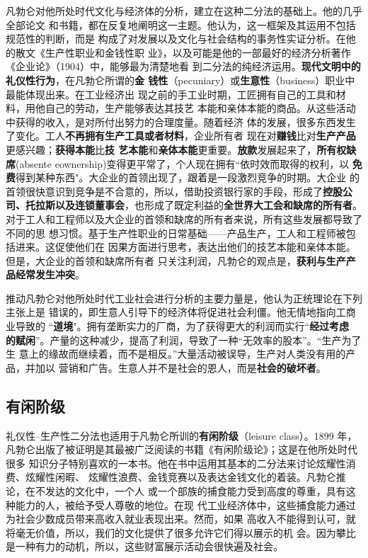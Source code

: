 凡勃仑对他所处时代文化与经济体的分析，建立在这种二分法的基础上。他的几乎全部论文
和书籍，都在反复地阐明这一主题。他认为，这一框架及其运用不包括规范性的判断，而是
构成了对发展以及文化与社会结构的事务性实证分析。在他的散文《生产性职业和金钱性职
业》，以及可能是他的一部最好的经济分析著作《企业论》（1904）中，能够最为清楚地看
到二分法的纯经济运用。\textbf{现代文明中的礼仪性行为}，在凡勃仑所谓的\textbf{金
钱性}（pecuniary）或\textbf{生意性}（business）职业中最能体现出来。在工业经济出
现之前的手工业时期，工匠拥有自己的工具和材料，用他自己的劳动，生产能够表达其技艺
本能和亲体本能的商品。从这些活动中获得的收入，是对所付出努力的合理度量。随着经济
体的发展，很多东西发生了变化。工人\textbf{不再拥有生产工具或者材料}，企业所有者
现在对\textbf{赚钱}比对\textbf{生产产品}更感兴趣；\textbf{获得本能}比\textbf{技
艺本能}和\textbf{亲体本能}更重要。\textbf{放款}发展起来了，\textbf{所有权缺
席}(absente eownership)变得更平常了，个人现在拥有“依时效而取得的权利，以
\textbf{免费}得到某种东西"。大企业的首领出现了，跟着是一段激烈竞争的时期。大企业
的首领很快意识到竞争是不合意的，所以，借助投资银行家的手段，形成了\textbf{控股公
司、托拉斯以及连锁董事会}，也形成了既定利益的\textbf{全世界大工会和缺席的所有者}。
对于工人和工程师以及大企业的首领和缺席的所有者来说，所有这些发展都导致了不同的思
想习惯。基于生产性职业的日常基础——产品生产，工人和工程师被包括进来。这促使他们在
因果方面进行思考，表达出他们的技艺本能和亲体本能。但是，大企业的首领和缺席所有者
只关注利润，凡勃仑的观点是，\textbf{获利与生产产品经常发生冲突}。

推动凡勃仑对他所处时代工业社会进行分析的主要力量是，他认为正统理论在下列主张上是
错误的，即生意人引导下的经济体将促进社会利僵。他无情地指向工商业导致的
“\textbf{道境}"。拥有垄断实力的厂商，为了获得更大的利润而实行“\textbf{经过考虑
的赋闲}”。产量的这种减少，提高了利润，导致了一种“无效率的股本”。“生产为了生
意上的缘故而继续着，而不是相反。”大量活动被误导，生产对人类没有用的产品，并加以
营销和广告。生意人并不是社会的恩人，而是\textbf{社会的破坏者}。

\subsection{有闲阶级}

礼仪性--生产性二分法也适用于凡勃仑所训的\textbf{有闲阶级}（leisure class）。1899
年，凡勃仑出版了被证明是其最被广泛阅读的书籍《有闲阶级论》；这是在他所处时代很多
知识分子特别喜欢的一本书。他在书中运用其基本的二分法来讨论炫耀性消费、炫耀性闲暇、
炫耀性浪费、金钱竞赛以及表达金钱文化的着装。凡勃仑推论，在不发达的文化中，一个人
或一个部族的捕食能力受到高度的尊重，具有这种能力的人，被给予受人尊敬的地位。在现
代工业经济体中，这些捕食能力通过为社会少数成员带来高收入就业表现出来。然而，如果
高收入不能得到认可，就将毫无价值，所以，我们的文化提供了很多允许它们得以展示的机
会。因为攀比是一种有力的动机，所以，这些财富展示活动会很快遍及社会。

